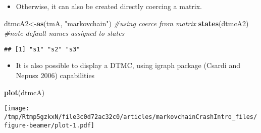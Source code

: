 \documentclass[ignorenonframetext,]{beamer}
\newenvironment{Shaded}{\begin{snugshade}}{\end{snugshade}}
\newcommand{\CommentTok}[1]{\textcolor[rgb]{0.56,0.35,0.01}{\textit{#1}}}
\newcommand{\KeywordTok}[1]{\textcolor[rgb]{0.13,0.29,0.53}{\textbf{#1}}}
\newcommand{\NormalTok}[1]{#1}
\newcommand{\StringTok}[1]{\textcolor[rgb]{0.31,0.60,0.02}{#1}}
\providecommand{\tightlist}{%
  \setlength{\itemsep}{0pt}\setlength{\parskip}{0pt}}
\providecommand{\tightlist}{
  \setlength{\itemsep}{0pt}\setlength{\parskip}{0pt}
}
\begin{document}
\begin{frame}[fragile]

\begin{itemize}
\tightlist
\item
  Otherwise, it can also be created directly coercing a matrix.
\end{itemize}

\begin{Shaded}
\begin{Highlighting}[]
\NormalTok{dtmcA2<-}\KeywordTok{as}\NormalTok{(tmA, }\StringTok{"markovchain"}\NormalTok{) }\CommentTok{#using coerce from matrix}
\KeywordTok{states}\NormalTok{(dtmcA2) }\CommentTok{#note default names assigned to states}
\end{Highlighting}
\end{Shaded}

\begin{verbatim}
## [1] "s1" "s2" "s3"
\end{verbatim}

\end{frame}

\begin{frame}[fragile]

\begin{itemize}
\tightlist
\item
  It is also possible to display a DTMC, using igraph package (Csardi
  and Nepusz 2006) capabilities
\end{itemize}

\begin{Shaded}
\begin{Highlighting}[]
\KeywordTok{plot}\NormalTok{(dtmcA)}
\end{Highlighting}
\end{Shaded}

\texttt{[image: /tmp/Rtmp5gzkxN/file3c0d72ac32c0/articles/markovchainCrashIntro\_files/figure-beamer/plot-1.pdf]}

\end{frame}
\end{document}
